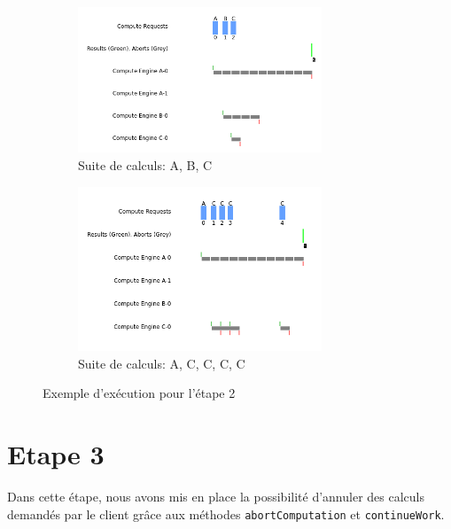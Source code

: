\documentclass{article}
\begin{document}
\begin{figure}[h]
    \begin{subfigure}{0.45\textwidth}
        \centering
        \includegraphics[width=0.8\textwidth]{figures/A_B_C}
        \caption{Suite de calculs: A, B, C}
    \end{subfigure}
    \begin{subfigure}{0.45\textwidth}
        \centering
        \includegraphics[width=0.8\textwidth]{figures/A_C_C_C_C}
        \caption{Suite de calculs: A, C, C, C, C}
    \end{subfigure}
    \caption{Exemple d'exécution pour l'étape 2}
    \label{fig:full2}
\end{figure}

\section{Etape 3}
Dans cette étape, nous avons mis en place la possibilité d’annuler des calculs demandés par le client grâce aux méthodes
\texttt{abortComputation} et \texttt{continueWork}.
\end{document}
